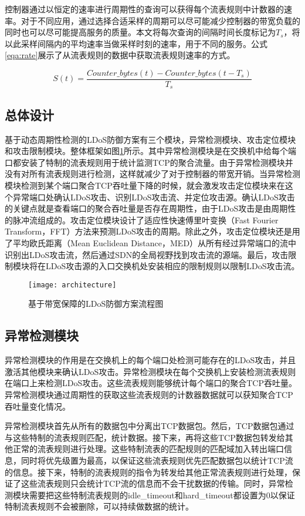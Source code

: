 控制器通过以恒定的速率进行周期性的查询可以获得每个流表规则中计数器的速率。对于不同应用，通过选择合适采样的周期可以尽可能减少控制器的带宽负载的同时也可以尽可能提高服务的质量。本文将每次查询的间隔时间长度标记为$T_s$，将以此采样间隔内的平均速率当做采样时刻的速率，用于不同的服务。公式\ref{eqa:rate}展示了从流表规则的数据中获取流表规则速率的方式。

\begin{equation}
	\label{eqa:rate}
	S(t) = \frac{Counter\_bytes(t) - Counter\_bytes(t - T_s)}{T_s}
\end{equation}

\subsection{总体设计}
\label{chap4:overview}

基于动态周期性检测的LDoS防御方案有三个模块，异常检测模块、攻击定位模块和攻击限制模块。整体框架如图\ref{fig:architecture}所示。其中异常检测模块是在交换机中给每个端口都安装了特制的流表规则用于统计监测TCP的聚合流量。由于异常检测模块并没有对所有流表规则进行检测，这样就减少了对于控制器的带宽开销。当异常检测模块检测到某个端口聚合TCP吞吐量下降的时候，就会激发攻击定位模块来在这个异常端口处确认LDoS攻击、识别LDoS攻击流、并定位攻击源。确认LDoS攻击的关键点就是查看端口的聚合吞吐量是否存在周期性，由于LDoS攻击是由周期性的脉冲流组成的。攻击定位模块设计了适应性快速傅里叶变换（Fast Fourier Transform，FFT）方法来预测LDoS攻击的周期。除此之外，攻击定位模块还是用了平均欧氏距离（Mean Euclidean Distance，MED）从所有经过异常端口的流中识别出LDoS攻击流，然后通过SDN的全局视野找到攻击流的源端。最后，攻击限制模块将在LDoS攻击源的入口交换机处安装相应的限制规则以限制LDoS攻击流。

\begin{figure}
    \centering
    \texttt{[image: architecture]}
    \caption{基于带宽保障的LDoS防御方案流程图}
    \label{fig:architecture}
\end{figure}

\subsection{异常检测模块}
\label{chap4:Monitor}
异常检测模块的作用是在交换机上的每个端口处检测可能存在的LDoS攻击，并且激活其他模块来确认LDoS攻击。异常检测模块在每个交换机上安装检测流表规则在端口上来检测LDoS攻击。这些流表规则能够统计每个端口的聚合TCP吞吐量。异常检测模块通过周期性的获取这些流表规则的计数器数据就可以获知聚合TCP吞吐量变化情况。

异常检测模块首先从所有的数据包中分离出TCP数据包。然后，TCP数据包通过与这些特制的流表规则匹配，统计数据。接下来，再将这些TCP数据包转发给其他正常的流表规则进行处理。这些特制流表的匹配规则的匹配域加入转出端口信息，同时将优先级置为最高，以保证这些流表规则优先匹配数据包以统计TCP流的信息。接下来，特制的流表规则的指令为转发给其他正常流表规则进行处理，保证了这些流表规则只会统计TCP流的信息而不会干扰数据的传输。同时，异常检测模块需要把这些特制流表规则的idle\_timeout和hard\_timeout都设置为0以保证特制流表规则不会被删除，可以持续做数据的统计。

